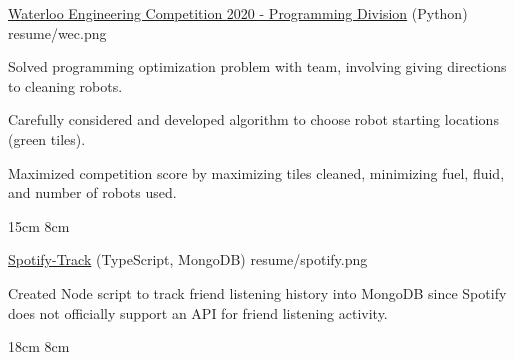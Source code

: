 \begin{cventries}
  \portfolioEntry
    {\href{https://github.com/danielq987/WECF2020}{Waterloo Engineering Competition 2020 - Programming Division} (Python)} %
    {resume/wec.png} %
    {
      \begin{cvitems} %
        \item {Solved programming optimization problem with team, involving giving directions to cleaning robots.}
        \item {Carefully considered and developed algorithm to choose robot starting locations (green tiles).}
        \item {Maximized competition score by maximizing tiles cleaned, minimizing fuel, fluid, and number of robots used.}
      \end{cvitems}
    }
    {15cm}
    {8cm}
  
  \newpage

  \portfolioEntry
    {\href{https://github.com/danielq987/spotify-track}{Spotify-Track} (TypeScript, MongoDB)} %
    {resume/spotify.png} %
    {
      \begin{cvitems} %
        \item {Created Node script to track friend listening history into MongoDB since Spotify does not officially support an API for friend listening activity.}
      \end{cvitems}
    }
    {18cm}
    {8cm}

\end{cventries}
